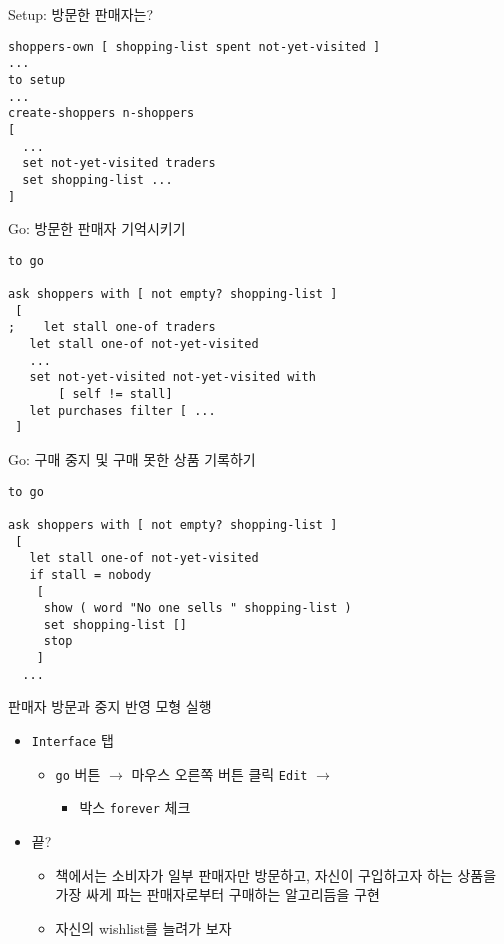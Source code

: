 \documentclass[hyperref={unicode}]{beamer}
\begin{document}
\begin{frame}[fragile]{Setup: 방문한 판매자는?}
\begin{verbatim}
shoppers-own [ shopping-list spent not-yet-visited ]	
...
to setup
...
create-shoppers n-shoppers
[
  ...
  set not-yet-visited traders
  set shopping-list ...
]

\end{verbatim}	
\end{frame}

\begin{frame}[fragile]{Go: 방문한 판매자 기억시키기}
\begin{verbatim}
to go
	
ask shoppers with [ not empty? shopping-list ]
 [
;    let stall one-of traders
   let stall one-of not-yet-visited
   ...
   set not-yet-visited not-yet-visited with 
       [ self != stall]
   let purchases filter [ ... 
 ]

\end{verbatim}	
\end{frame}


\begin{frame}[fragile]{Go: 구매 중지 및 구매 못한 상품 기록하기}
\begin{verbatim}
to go
	
ask shoppers with [ not empty? shopping-list ]
 [
   let stall one-of not-yet-visited
   if stall = nobody
    [
     show ( word "No one sells " shopping-list )
     set shopping-list []
     stop
    ]
  ...  	
\end{verbatim}	
\end{frame}

\begin{frame}[fragile]{판매자 방문과 중지 반영 모형 실행}
\begin{itemize}
\item \verb|Interface| 탭
	\begin{itemize}
	\item \verb|go| 버튼 $\rightarrow$ 마우스 오른쪽 버튼 클릭 \verb|Edit| $\rightarrow$ 
		\begin{itemize}
		\item 박스 \verb|forever| 체크
		\end{itemize}	
	\end{itemize}
\item 끝?
	\begin{itemize}
	\item 책에서는 소비자가 일부 판매자만 방문하고, 자신이 구입하고자 하는 상품을 가장 싸게 파는 판매자로부터 구매하는 알고리듬을 구현
	\item 자신의 wishlist를 늘려가 보자
	\end{itemize}
\end{itemize}		
\end{frame}
\end{document}
